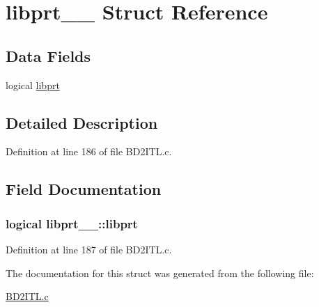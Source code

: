 \hypertarget{structlibprt__1__}{}\section{libprt\+\_\+\_\+ Struct Reference}
\label{structlibprt__1__}
\subsection*{Data Fields}
\begin{DoxyCompactItemize}
\item 
logical \hyperlink{structlibprt__1___a0c2398e1c46b2710a11ac7dc58d0c1e4}{libprt}
\end{DoxyCompactItemize}


\subsection{Detailed Description}


Definition at line 186 of file B\+D2\+I\+T\+L.\+c.



\subsection{Field Documentation}
\subsubsection[{\texorpdfstring{libprt}{libprt}}]{\setlength{\rightskip}{0pt plus 5cm}logical libprt\+\_\+\_\+\+::libprt}\hypertarget{structlibprt__1___a0c2398e1c46b2710a11ac7dc58d0c1e4}{}\label{structlibprt__1___a0c2398e1c46b2710a11ac7dc58d0c1e4}


Definition at line 187 of file B\+D2\+I\+T\+L.\+c.



The documentation for this struct was generated from the following file\+:\begin{DoxyCompactItemize}
\item 
\hyperlink{BD2ITL_8c}{B\+D2\+I\+T\+L.\+c}\end{DoxyCompactItemize}
